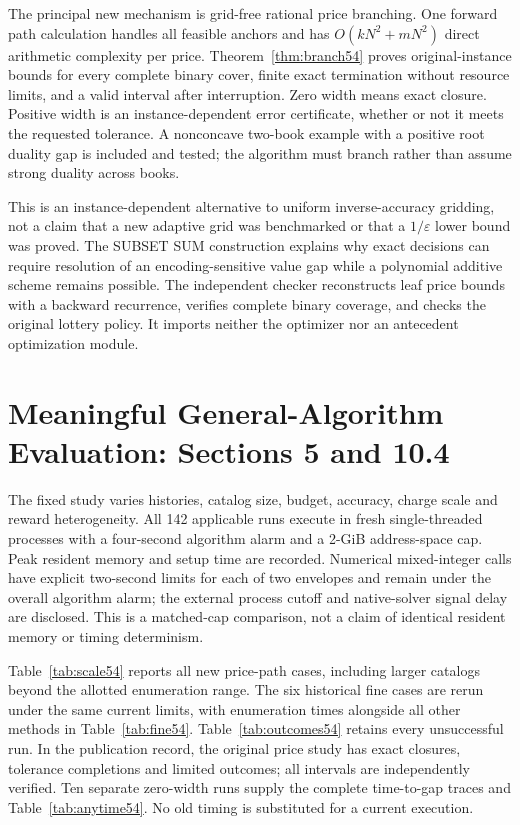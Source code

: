 The principal new mechanism is grid-free rational price branching. One forward path calculation handles all feasible anchors and has $O(kN^2+mN^2)$ direct arithmetic complexity per price. Theorem~\ref{thm:branch54} proves original-instance bounds for every complete binary cover, finite exact termination without resource limits, and a valid interval after interruption. Zero width means exact closure. Positive width is an instance-dependent error certificate, whether or not it meets the requested tolerance. A nonconcave two-book example with a positive root duality gap is included and tested; the algorithm must branch rather than assume strong duality across books.

This is an instance-dependent alternative to uniform inverse-accuracy gridding, not a claim that a new adaptive grid was benchmarked or that a $1/\varepsilon$ lower bound was proved. The SUBSET SUM construction explains why exact decisions can require resolution of an encoding-sensitive value gap while a polynomial additive scheme remains possible. The independent checker reconstructs leaf price bounds with a backward recurrence, verifies complete binary coverage, and checks the original lottery policy. It imports neither the optimizer nor an antecedent optimization module.

\section{Meaningful General-Algorithm Evaluation: Sections 5 and 10.4}
The fixed study varies histories, catalog size, budget, accuracy, charge scale and reward heterogeneity. All 142 applicable runs execute in fresh single-threaded processes with a four-second algorithm alarm and a 2-GiB address-space cap. Peak resident memory and setup time are recorded. Numerical mixed-integer calls have explicit two-second limits for each of two envelopes and remain under the overall algorithm alarm; the external process cutoff and native-solver signal delay are disclosed. This is a matched-cap comparison, not a claim of identical resident memory or timing determinism.

Table~\ref{tab:scale54} reports all new price-path cases, including larger catalogs beyond the allotted enumeration range. The six historical fine cases are rerun under the same current limits, with enumeration times alongside all other methods in Table~\ref{tab:fine54}. Table~\ref{tab:outcomes54} retains every unsuccessful run. In the publication record, the original price study has \PriceExact{} exact closures, \PriceTolerance{} tolerance completions and \PriceLimited{} limited outcomes; all \PriceChecked{} intervals are independently verified. Ten separate zero-width runs supply the complete time-to-gap traces and Table~\ref{tab:anytime54}. No old timing is substituted for a current execution.

